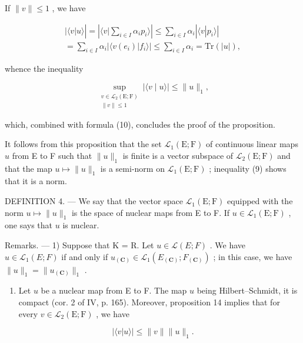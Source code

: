 If \(\|v\| \leqslant 1\) , we have

\[
\begin{array}{c} | \langle v | u \rangle | = \left| \langle v | \sum_ {i \in I} \alpha_ {i} p _ {i} \rangle \right| \leqslant \sum_ {i \in I} \alpha_ {i} | \langle v | p _ {i} \rangle | \\ = \sum_ {i \in I} \alpha_ {i} | \langle v (e _ {i}) | f _ {i} \rangle | \leqslant \sum_ {i \in I} \alpha_ {i} = \mathrm{Tr} (| u |), \end{array}
\]

whence the inequality

\[
\sup_{\substack{v\in \mathcal{L}_{2}(\mathrm{E};\mathrm{F})\\ \| v\| \leqslant 1}}|\langle v\mid u\rangle |\leqslant \| u\|_{1},
\]

which, combined with formula (10), concludes the proof of the proposition.

It follows from this proposition that the set \(\mathcal{L}_1(\mathrm{E};\mathrm{F})\) of continuous linear maps \(u\) from E to F such that \(\| u\| _1\) is finite is a vector subspace of \(\mathcal{L}_{2}(\mathrm{E};\mathrm{F})\) and that the map \(u\mapsto \| u\| _1\) is a semi-norm on \(\mathcal{L}_1(\mathrm{E};\mathrm{F})\) ; inequality (9) shows that it is a norm.

DEFINITION 4. --- We say that the vector space \(\mathcal{L}_{1}(\mathrm{E};\mathrm{F})\) equipped with the norm \(u\mapsto \| u\|_{1}\) is the space of nuclear maps from E to F. If \(u\in \mathcal{L}_1(\mathrm{E};\mathrm{F})\) , one says that \(u\) is nuclear.

Remarks. --- 1) Suppose that K = R. Let \(u \in \mathcal{L}(E; F)\) . We have \(u \in \mathcal{L}_{1}(E; F)\) if and only if \(u_{(\mathbf{C})} \in \mathcal{L}_{1}(E_{(\mathbf{C})}; F_{(\mathbf{C})})\) ; in this case, we have \(\|u\|_{1} = \|u_{(\mathbf{C})}\|_{1}\) .

\begin{enumerate}
\def\labelenumi{\arabic{enumi})}
\setcounter{enumi}{1}
\tightlist
\item
  Let \(u\) be a nuclear map from E to F. The map \(u\) being Hilbert--Schmidt, it is compact (cor. 2 of IV, p. 165). Moreover, proposition 14 implies that for every \(v \in \mathcal{L}_2(\mathrm{E};\mathrm{F})\) , we have
\end{enumerate}

\[
| \langle v | u \rangle | \leqslant \| v \| \| u \| _ {1}.\tag{11}
\]

